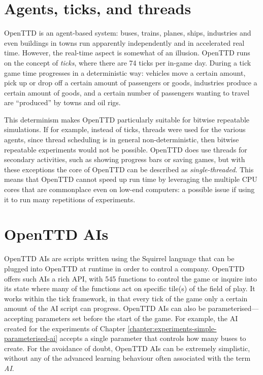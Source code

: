 \documentclass[logo,msc,dsti]{style/infthesis}    %
\begin{document}
{\section{Agents, ticks, and threads}

OpenTTD is an agent-based system: buses, trains, planes, ships, industries and even buildings in towns run apparently independently and in accelerated real time. However, the real-time aspect is somewhat of an illusion. OpenTTD runs on the concept of \emph{ticks}, where there are 74 ticks per in-game day. During a tick game time progresses in a deterministic way: vehicles move a certain amount, pick up or drop off a certain amount of passengers or goods, industries produce a certain amount of goods, and a certain number of passengers wanting to travel are ``produced'' by towns and oil rigs.

This determinism makes OpenTTD particularly suitable for bitwise repeatable simulations. If for example, instead of ticks, threads were used for the various agents, since thread scheduling is in general non-deterministic, then bitwise repeatable experiments would not be possible. OpenTTD does use threads for secondary activities, such as showing progress bars or saving games, but with these exceptions the core of OpenTTD can be described as \emph{single-threaded}. This means that OpenTTD cannot speed up run time by leveraging the multiple CPU cores that are commonplace even on low-end computers: a possible issue if using it to run many repetitions of experiments.

\section{OpenTTD AIs}

OpenTTD AIs are scripts written using the Squirrel language that can be plugged into OpenTTD at runtime in order to control a company. OpenTTD offers such AIs a rich API, with 545 functions to control the game or inquire into its state \cite{OpenTTDAIAPIDocs} where many of the functions act on specific tile(s) of the field of play. It works within the tick framework, in that every tick of the game only a certain amount of the AI script can progress. OpenTTD AIs can also be parameterised---accepting parameters set before the start of the game. For example, the AI created for the experiments of Chapter \ref{chapter:experiments-simple-parameterised-ai} accepts a single parameter that controls how many buses to create. For the avoidance of doubt, OpenTTD AIs can be extremely simplistic, without any of the advanced learning behaviour often associated with the term \emph{AI}.

}
\end{document}
